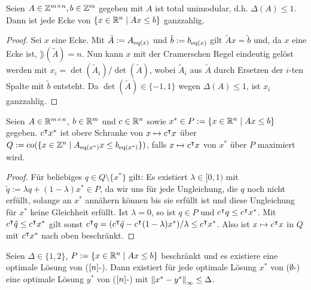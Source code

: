 \begin{lemma}\label{lem:unimodular}
	Seien $A\in\mathbb{Z}^{m\times n},b\in\mathbb{Z}^m$ gegeben mit $A$ ist total unimodular, d.h. $\Delta(A)\leq 1$.
	Dann ist jede Ecke von $\{x\in\mathbb{R}^n \mid Ax\leq b \}$ ganzzahlig.
\end{lemma}
\begin{proof}
	Sei $x$ eine Ecke.
	Mit $\tilde{A} := A_{\operatorname{eq}(x)}$ und $\tilde{b}:=b_{\operatorname{eq}(x)}$ gilt $\tilde{A} x = \tilde{b}$ und, da $x$ eine Ecke ist, $\rang(\tilde{A})=n$.
	Nun kann $x$ mit der Cramerschen Regel eindeutig gelöst werden mit $x_i=\det(\tilde{A}_i)/\det(\tilde{A})$, wobei $\tilde{A}_i$ aus $\tilde{A}$ durch Ersetzen der $i$-ten Spalte mit $\tilde{b}$ entsteht.
	Da $\det(\tilde{A})\in\{-1,1\}$ wegen $\Delta(A)\leq 1$, ist $x_i$ ganzzahlig.
\end{proof}
\begin{lemma}\label{lem:q-upper-bound}
	Seien $A\in\mathbb{R}^{m\times n}$, $b\in\mathbb{R}^m$ und $c\in\mathbb{R}^n$ sowie $x^*\in P:=\{ x\in\mathbb{R}^n \mid Ax\leq b \}$ gegeben.
	 $c^\intercal x^*$ ist obere Schranke von $x\mapsto c^\intercal x$ über $Q:=\operatorname{co}(\{x\in\mathbb{Z}^n \mid A_{\operatorname{eq}(x^*)}x \leq b_{\operatorname{eq}(x^*)} \})$, falls $x\mapsto c^\intercal x$  von $x^*$ über $P$ maximiert wird.
\end{lemma}
\begin{proof}
	Für beliebiges $q\in Q\setminus\{x^*\}$ gilt:
	Es existiert $\lambda\in[0,1)$ mit $\tilde{q}:=\lambda q+(1-\lambda)x^*\in P$, da wir uns für jede Ungleichung, die $q$ noch nicht erfüllt, solange an $x^*$ annähern können bis sie erfüllt ist und diese Ungleichung für $x^*$ keine Gleichheit erfüllt.
	Ist $\lambda=0$, so ist $q\in P$ und $c^\intercal q\leq c^\intercal x^*$. Mit $c^\intercal \tilde{q} \leq c^\intercal x^*$ gilt sonst $c^\intercal q=(c^\intercal \tilde{q} - c^\intercal(1-\lambda)x^*)/\lambda \leq c^\intercal x^*$.
	Also ist $x\mapsto c^\intercal x$ in $Q$ mit $c^\intercal x^*$ nach oben beschränkt.
\end{proof}
\begin{lemma}\label{lem:i-n-j-e}
	Seien $\Delta\in\{1,2\}$, $P:=\{x\in\mathbb{R}^n \mid Ax\leq b \}$ beschränkt und es existiere eine optimale Lösung von ($[n]$-\MIPI).
	Dann existiert für jede optimale Lösung $x^*$ von ($\emptyset$-\MIPI) eine optimale Lösung $y^*$ von ($[n]$-\MIPI) mit $\left\lVert x^*-y^*\right\rVert_\infty\leq \Delta$.
\end{lemma}
